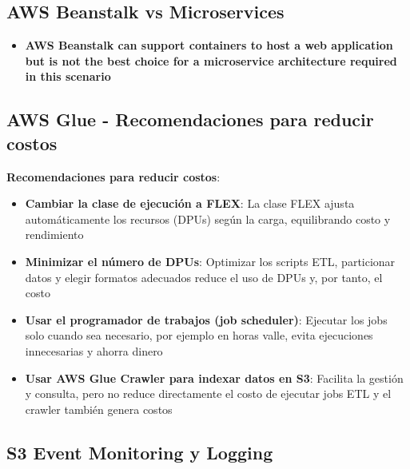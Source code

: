 \documentclass[12pt,a4paper]{report}
\newcommand{\important}[1]{\textcolor{dangerred}{\textbf{#1}}}
\begin{document}
\subsection{AWS Beanstalk vs Microservices}

\begin{itemize}
    \item \important{AWS Beanstalk can support containers to host a web application but is not the best choice for a microservice architecture required in this scenario}
\end{itemize}

\subsection{AWS Glue - Recomendaciones para reducir costos}

\textbf{Recomendaciones para reducir costos}:

\begin{tipbox}
\begin{itemize}
    \item \textbf{Cambiar la clase de ejecución a FLEX}: La clase FLEX ajusta automáticamente los recursos (DPUs) según la carga, equilibrando costo y rendimiento
    \item \textbf{Minimizar el número de DPUs}: Optimizar los scripts ETL, particionar datos y elegir formatos adecuados reduce el uso de DPUs y, por tanto, el costo
    \item \textbf{Usar el programador de trabajos (job scheduler)}: Ejecutar los jobs solo cuando sea necesario, por ejemplo en horas valle, evita ejecuciones innecesarias y ahorra dinero
\end{itemize}
\end{tipbox}

\begin{warningbox}
\begin{itemize}
    \item \textbf{Usar AWS Glue Crawler para indexar datos en S3}: Facilita la gestión y consulta, pero no reduce directamente el costo de ejecutar jobs ETL y el crawler también genera costos
\end{itemize}
\end{warningbox}

\subsection{S3 Event Monitoring y Logging}
\end{document}
